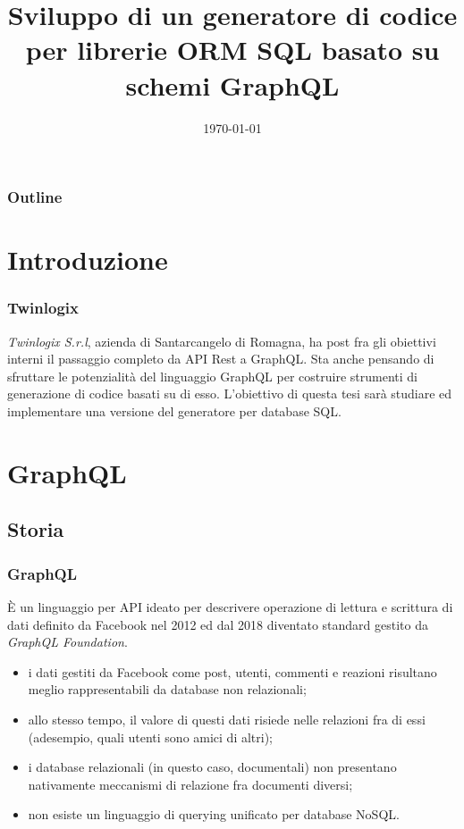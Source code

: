 \documentclass[c]{beamer}
\title[GraphQL e Model Driven Programming]{Sviluppo di un generatore di codice per librerie ORM SQL basato su schemi GraphQL}
\author[Ivan Perazzini]{\texorpdfstring{\usebox{\authbox}}{}}
\institute[Università di Bologna]{Ingegneria e Scienze Informatiche\\Alma Mater Studiorum—Università di Bologna, Cesena}
\date{\today}
\begin{document}
    \begin{frame}
        \titlepage
    \end{frame}

    \begin{frame}
        \frametitle{Outline}
        \tableofcontents
    \end{frame}
    \section{Introduzione}
        \begin{frame}
            \frametitle{Twinlogix}
            \emph{Twinlogix S.r.l}, azienda di Santarcangelo di Romagna, ha post fra gli obiettivi interni il passaggio completo da API Rest a GraphQL.
            \vfill
            Sta anche pensando di sfruttare le potenzialità del linguaggio GraphQL per costruire strumenti di generazione di codice basati su di esso.
            \vfill
            L'obiettivo di questa tesi sarà studiare ed implementare una versione del generatore per database SQL.
        \end{frame}
    \section{GraphQL}
        \subsection{Storia}
            \begin{frame}
                \frametitle{GraphQL}
                È un linguaggio per API ideato per descrivere operazione di lettura e scrittura di dati definito da Facebook nel 2012 ed dal 2018 diventato standard gestito da \emph{GraphQL Foundation}.
                \begin{itemize}
                    \item i dati gestiti da Facebook come post, utenti, commenti e reazioni risultano meglio rappresentabili da database non relazionali;
                    \item allo stesso tempo, il valore di questi dati risiede nelle relazioni fra di essi (adesempio, quali utenti sono amici di altri);
                    \item i database relazionali (in questo caso, documentali) non presentano nativamente meccanismi di relazione fra documenti diversi;
                    \item non esiste un linguaggio di querying unificato per database NoSQL.
                \end{itemize}
            \end{frame}
\end{document}
